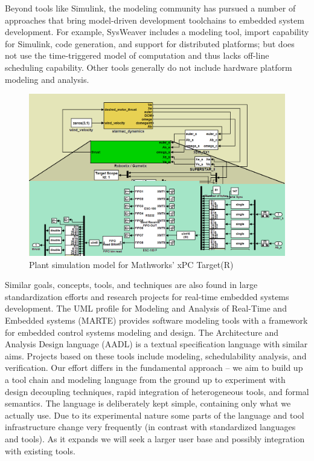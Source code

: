 
Beyond tools like Simulink, the modeling community has pursued a number of approaches that bring model-driven development toolchains to embedded system development. For example, SysWeaver \cite{sysweaver:niz} includes a modeling tool, import capability for Simulink, code generation, and support for distributed platforms; but does not use the time-triggered model of computation  and thus lacks off-line scheduling capability.  Other tools generally do not include hardware platform modeling and analysis.


\begin{figure}[ht]
\centering
\includegraphics[width=\columnwidth]{figures/xpc_model.png}
    \caption{Plant simulation model for Mathworks' xPC Target(R)}
    \label{fig:xpc_sim}
\end{figure}

Similar goals, concepts, tools, and techniques are also found in large standardization efforts and research projects for real-time embedded systems development.  The UML profile for Modeling and Analysis of Real-Time and Embedded systems (MARTE)\cite{marte} provides software modeling tools with a framework for embedded control systems modeling and design.  The Architecture and Analysis Design language (AADL)\cite{AADL} is a textual specification language with similar aims. Projects based on these tools include modeling\cite{Topcased}, schedulability analysis\cite{cheddar}, and verification\cite{aadl_bip}.  Our effort differs in the fundamental approach -- we aim to build up a tool chain and modeling language from the ground up to experiment with design decoupling techniques, rapid integration of heterogeneous tools, and formal semantics.  The language is deliberately kept simple, containing only what we actually use.  Due to its experimental nature some parts of the language and tool infrastructure change very frequently (in contrast with standardized languages and tools).  As it expands we will seek a larger user base and possibly integration with existing tools.


